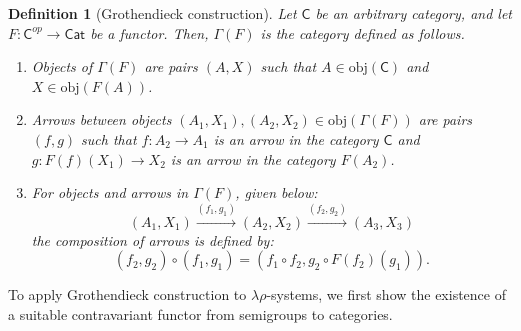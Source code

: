\documentclass{amsart}
\newtheorem{definition}{Definition}
\begin{document}
\begin{definition}[Grothendieck construction]
Let\/ $\mathsf{C}$ be an arbitrary category, and let
$F\colon \mathsf{C}^{op}\to\mathsf{Cat}$
be a functor. Then, $\mathsf{\Gamma}(F)$ is the category defined as follows.
\begin{enumerate}
\item Objects of\/ $\mathsf{\Gamma}(F)$ are pairs $(A,X)$ such that
$A\in \mathrm{obj}(\mathsf{C})$ and $X\in \mathrm{obj}(F(A))$. 
\item Arrows between objects $(A_1,X_1),(A_2,X_2)\in
\mathrm{obj}(\mathsf{\Gamma}(F))$ are pairs
  $(f,g)$ such that $f\colon A_2\to A_1$ is an arrow in the category
$\mathsf{C}$ and $g\colon F(f)(X_1)\to X_2$ is an arrow in the category $F(A_2)$. 
\item For objects and arrows in $\mathsf{\Gamma}(F)$, given below:
$$
(A_1,X_1)\overset{(f_1,g_1)}\longrightarrow(A_2,X_2)
\overset{(f_2,g_2)}\longrightarrow(A_3,X_3) 
$$ 
the composition of arrows is defined by:
$$
(f_2,g_2)\circ(f_1,g_1)= (f_1\circ f_2, g_2\circ F(f_2)(g_1)). 
$$
\end{enumerate}
\end{definition}

To apply Grothendieck construction to $\lambda\rho$-systems, we first show the
existence of a suitable contravariant functor from semigroups to categories.
\end{document}
